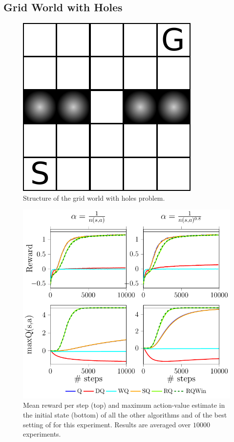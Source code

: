 \documentclass[conference]{IEEEtran}
\begin{document}
\subsection{Grid World with Holes}
\begin{figure}[t]
\centering
\includegraphics[scale=.55]{./imgs/gridHole/gridhole.pdf}
\caption{Structure of the grid world with holes problem.}
  \label{F:grid_hole_map}
\end{figure}
\begin{figure}[t]
\begin{minipage}{\columnwidth}
\centering
  \includegraphics[scale=.7]{./imgs/gridHole/grid_hole.pdf}
\end{minipage}
  \caption{Mean reward per step (top) and maximum action-value estimate in the initial state (bottom) of all the other algorithms and of the best setting of \alg for this experiment. Results are averaged over $10000$ experiments.}
  \label{F:hole}
\end{figure}
\end{document}
